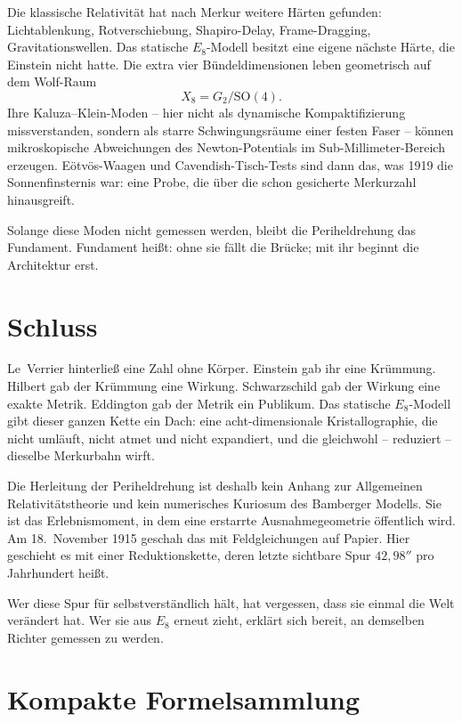 \documentclass[11pt,a4paper]{article}
\theoremstyle{definition}
\theoremstyle{remark}
\begin{document}
Die klassische Relativität hat nach Merkur weitere Härten gefunden: Lichtablenkung, Rotverschiebung, Shapiro-Delay, Frame-Dragging, Gravitationswellen. Das statische \(E_8\)-Modell besitzt eine eigene nächste Härte, die Einstein nicht hatte. Die extra vier Bündeldimensionen leben geometrisch auf dem Wolf-Raum
\begin{equation}
X_8=G_2/\mathrm{SO}(4).
\end{equation}
Ihre Kaluza--Klein-Moden -- hier nicht als dynamische Kompaktifizierung missverstanden, sondern als starre Schwingungsräume einer festen Faser -- können mikroskopische Abweichungen des Newton-Potentials im Sub-Millimeter-Bereich erzeugen. Eötvös-Waagen und Cavendish-Tisch-Tests sind dann das, was 1919 die Sonnenfinsternis war: eine Probe, die über die schon gesicherte Merkurzahl hinausgreift.

Solange diese Moden nicht gemessen werden, bleibt die Periheldrehung das Fundament. Fundament heißt: ohne sie fällt die Brücke; mit ihr beginnt die Architektur erst.

\section{Schluss}

Le~Verrier hinterließ eine Zahl ohne Körper. Einstein gab ihr eine Krümmung. Hilbert gab der Krümmung eine Wirkung. Schwarzschild gab der Wirkung eine exakte Metrik. Eddington gab der Metrik ein Publikum. Das statische \(E_8\)-Modell gibt dieser ganzen Kette ein Dach: eine acht-dimensionale Kristallographie, die nicht umläuft, nicht atmet und nicht expandiert, und die gleichwohl -- reduziert -- dieselbe Merkurbahn wirft.

Die Herleitung der Periheldrehung ist deshalb kein Anhang zur Allgemeinen Relativitätstheorie und kein numerisches Kuriosum des Bamberger Modells. Sie ist das Erlebnismoment, in dem eine erstarrte Ausnahmegeometrie öffentlich wird. Am 18.~November 1915 geschah das mit Feldgleichungen auf Papier. Hier geschieht es mit einer Reduktionskette, deren letzte sichtbare Spur \(42{,}98''\) pro Jahrhundert heißt.

Wer diese Spur für selbstverständlich hält, hat vergessen, dass sie einmal die Welt verändert hat. Wer sie aus \(E_8\) erneut zieht, erklärt sich bereit, an demselben Richter gemessen zu werden.

\appendix
\section{Kompakte Formelsammlung}
\end{document}
